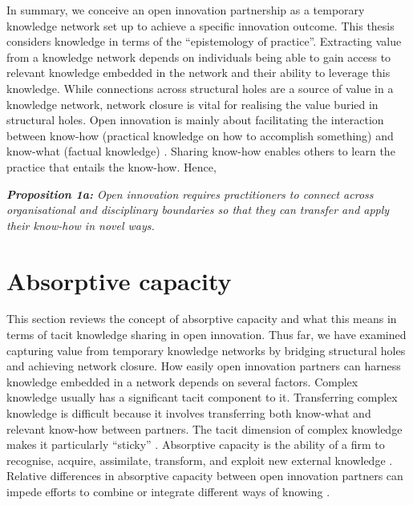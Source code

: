 In summary, we conceive an open innovation partnership as a temporary knowledge network set up to achieve a specific innovation outcome. This thesis considers knowledge in terms of the \enquote{epistemology of practice}. Extracting value from a knowledge network depends on individuals being able to gain access to relevant knowledge embedded in the network and their ability to leverage this knowledge. While connections across structural holes are a source of value in a knowledge network, network closure is vital for realising the value buried in structural holes.  Open innovation is mainly about facilitating the interaction between know-how (practical knowledge on how to accomplish something) and know-what (factual knowledge) \citep{winter1987knowledge,garud1997distinction}. Sharing know-how enables others to learn the practice that entails the know-how. Hence, \bigskip

\begin{tcolorbox}
\textit{\textbf{Proposition 1a:} Open  innovation  requires  practitioners  to  connect across organisational and disciplinary boundaries so that they can transfer and apply their know-how in novel ways.}
\end{tcolorbox}

\section{Absorptive capacity} \label{sec:absorptive}

This section reviews the concept of absorptive capacity and what this means in terms of tacit knowledge sharing in open innovation. Thus far, we have examined capturing value from temporary knowledge networks by bridging structural holes and achieving network closure. How easily open innovation partners can harness knowledge embedded in a network depends on several factors. Complex knowledge usually has a significant tacit component to it. Transferring complex knowledge is difficult because it involves transferring both know-what and relevant know-how between partners. The tacit dimension of complex knowledge makes it particularly \enquote{sticky} \citep{von1994sticky,szulanski2003sticky}. Absorptive capacity is the ability of a firm to recognise, acquire, assimilate, transform, and exploit new external knowledge \citep{cohen1990absorptive}. Relative differences in absorptive capacity between open innovation partners can impede efforts to combine or integrate different ways of knowing \citep{vanhaverbeke2007connecting,lichtenthaler2016absorptive}. \medskip

